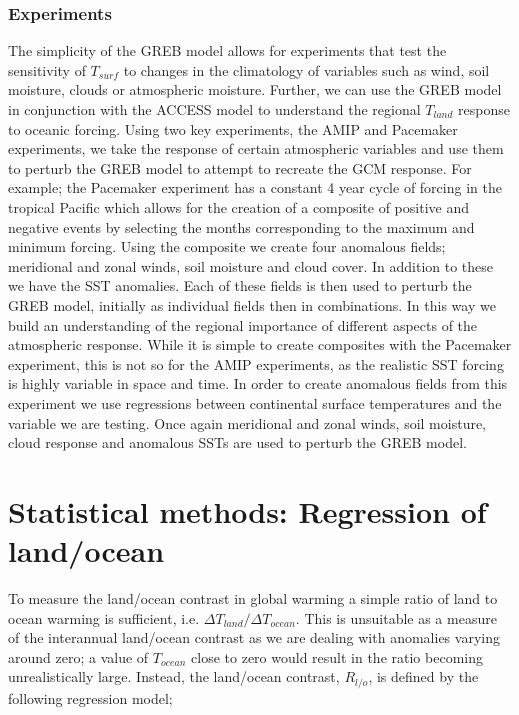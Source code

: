 \subsubsection{Experiments}
The simplicity of the GREB model allows for experiments that test the 
sensitivity of $T_{surf}$ to changes in the climatology of variables such as 
wind, soil moisture, clouds or atmospheric moisture. Further, we can use the 
GREB model in conjunction with the ACCESS model to understand the regional 
$T_{land}$ response to oceanic forcing. Using two key experiments, the AMIP and 
Pacemaker experiments, we take the response of certain atmospheric variables and 
use them to perturb the GREB model to attempt to recreate the GCM response. For 
example; the Pacemaker experiment has a constant 4 year cycle of forcing in the 
tropical Pacific which allows for the creation of a composite of positive and 
negative events by selecting the months corresponding to the maximum and minimum 
forcing.  Using the composite we create four anomalous fields; meridional and 
zonal winds, soil moisture and cloud cover. In addition to these we have the SST 
anomalies.  Each of these fields is then used to perturb the GREB model, 
initially as individual fields then in combinations. In this way we build an 
understanding of the regional importance of different aspects of the atmospheric 
response. While it is simple to create composites with the Pacemaker experiment, 
this is not so for the AMIP experiments, as the realistic SST forcing is highly 
variable in space and time.  In order to create anomalous fields from this 
experiment we use regressions between continental surface temperatures and the 
variable we are testing. Once again meridional and zonal winds, soil moisture, 
cloud response and anomalous SSTs are used to perturb the GREB model.



\section{Statistical methods: Regression of land/ocean}\label{ssec:rlo}

To measure the land/ocean contrast in global warming a simple ratio of land to 
ocean warming is sufficient, i.e. $\Delta T_{land}/\Delta T_{ocean}$. This is 
unsuitable as a measure of the interannual land/ocean contrast as we are dealing 
with anomalies varying around zero; a value of $T_{ocean}$ close to zero would 
result in the ratio becoming unrealistically large. Instead, the land/ocean 
contrast, $R_{l/o}$, is defined by the following regression model;

